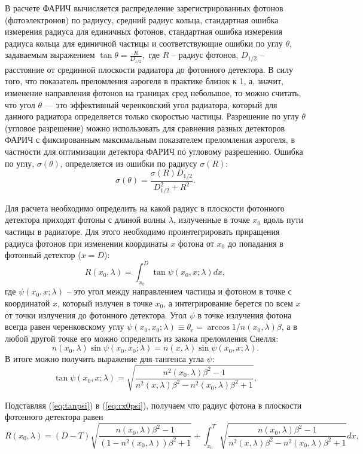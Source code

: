 \documentclass[12pt]{article}
\begin{document}
В расчете ФАРИЧ вычисляется распределение зарегистрированных фотонов (фотоэлектронов) по радиусу, средний радиус кольца, 
стандартная ошибка измерения радиуса для единичных фотонов, стандартная ошибка измерения радиуса кольца для единичной частицы и соответствующие 
ошибки по углу $\theta$, задаваемым выражением 
\(\tan\theta = \frac{R}{D_{1/2}},\)
где $R$ -- радиус фотонов, $D_{1/2}$ -- расстояние от срединной плоскости радиатора до фотонного детектора.
В силу того, что показатель преломления аэрогеля в практике близок к 1, а, значит, изменение направления фотонов на границах сред небольшое,
то можно считать, что угол $\theta$ --- это эффективный черенковский угол радиатора, который для данного радиатора определяется только скоростью частицы. 
Разрешение по углу $\theta$ (угловое разрешение) можно использовать для сравнения разных детекторов ФАРИЧ с фиксированным максимальным показателем преломления 
аэрогеля, в частности для оптимизации детектора ФАРИЧ по угловому разрешению.
Ошибка по углу, $\sigma(\theta)$, определяется из ошибки по радиусу $\sigma(R)$:
\[\sigma(\theta) = \frac{\sigma(R) D_{1/2}}{D_{1/2}^2+R^2}.\]

Для расчета необходимо определить на какой радиус в плоскости фотонного детектора приходят фотоны с длиной волны $\lambda$, излученные в точке $x_0$ вдоль пути частицы в
радиаторе. Для этого необходимо проинтегрировать приращения радиуса фотонов при изменении координаты $x$ фотона от $x_0$ до попадания в фотонный детектор ($x=D$):
\begin{equation}
R(x_0,\lambda) = \int_{x_0}^D \tan\psi(x_0,x;\lambda) dx,
\label{eq:rx0psi}
\end{equation}
где $\psi(x_0,x;\lambda)$ -- это угол между направлением частицы и фотоном в точке с координатой $x$, который излучен в точке $x_0$, а интегрирование берется по всем $x$ от 
точки излучения до фотонного детектора. Угол $\psi$ в точке излучения фотона всегда равен черенковскому углу $\psi(x_0,x_0;\lambda) \equiv \theta_c = \arccos{1/n(x_0,\lambda)\beta}$, а 
в любой другой точке его можно определить из закона преломления Снелля:
\[n(x_0,\lambda)\sin\psi(x_0,x_0;\lambda) = n(x,\lambda)\sin\psi(x_0,x;\lambda).\]
В итоге можно получить выражение для тангенса угла $\psi$:
\begin{equation}
\tan\psi(x_0,x;\lambda) = \sqrt{\frac{n^2(x_0,\lambda)\beta^2-1}{n^2(x,\lambda)\beta^2-n^2(x_0,\lambda)\beta^2+1}},
\label{eq:tanpsi}
\end{equation}

Подставляя (\ref{eq:tanpsi}) в (\ref{eq:rx0psi}), получаем что радиус фотона в плоскости фотонного детектора равен
\begin{equation}
R(x_0,\lambda) = (D-T)\sqrt{\frac{n(x_0,\lambda)\beta^2-1}{(1-n^2(x_0,\lambda))\beta^2+1}} + 
\int_{x_0}^T \sqrt{\frac{n(x_0,\lambda)\beta^2-1}{n^2(x,\lambda)\beta^2-n^2(x_0,\lambda)\beta^2+1}} dx,
\label{eq:rx0}
\end{equation}
\end{document}
